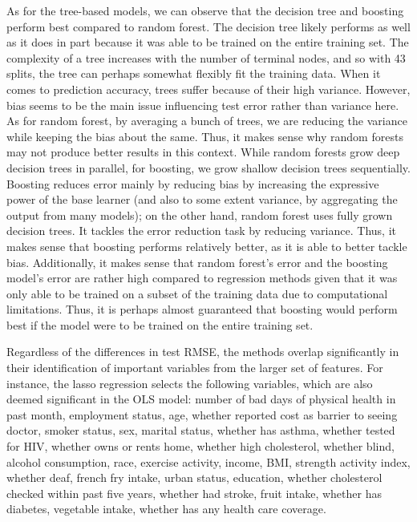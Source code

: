 \documentclass[
]{article}
\begin{document}
As for the tree-based models, we can observe that the decision tree and boosting perform best compared to random forest. The decision tree likely performs as well as it does in part because it was able to be trained on the entire training set. The complexity of a tree increases with the number of terminal nodes, and so with 43 splits, the tree can perhaps somewhat flexibly fit the training data. When it comes to prediction accuracy, trees suffer because of their high variance. However, bias seems to be the main issue influencing test error rather than variance here. As for random forest, by averaging a bunch of trees, we are reducing the variance while keeping the bias about the same. Thus, it makes sense why random forests may not produce better results in this context. While random forests grow deep decision trees in parallel, for boosting, we grow shallow decision trees sequentially. Boosting reduces error mainly by reducing bias by increasing the expressive power of the base learner (and also to some extent variance, by aggregating the output from many models); on the other hand, random forest uses fully grown decision trees. It tackles the error reduction task by reducing variance. Thus, it makes sense that boosting performs relatively better, as it is able to better tackle bias. Additionally, it makes sense that random forest's error and the boosting model's error are rather high compared to regression methods given that it was only able to be trained on a subset of the training data due to computational limitations. Thus, it is perhaps almost guaranteed that boosting would perform best if the model were to be trained on the entire training set.

Regardless of the differences in test RMSE, the methods overlap significantly in their identification of important variables from the larger set of features. For instance, the lasso regression selects the following variables, which are also deemed significant in the OLS model: number of bad days of physical health in past month, employment status, age, whether reported cost as barrier to seeing doctor, smoker status, sex, marital status, whether has asthma, whether tested for HIV, whether owns or rents home, whether high cholesterol, whether blind, alcohol consumption, race, exercise activity, income, BMI, strength activity index, whether deaf, french fry intake, urban status, education, whether cholesterol checked within past five years, whether had stroke, fruit intake, whether has diabetes, vegetable intake, whether has any health care coverage.
\end{document}
